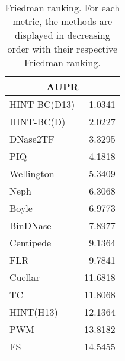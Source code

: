 \documentclass[landscape, 6pt]{report}
\begin{document}
\begin{table}[h!]
\label{tab:ranking}
\vspace{0.0cm}
\begin{center}
\caption{Friedman ranking. For each metric, the methods are displayed in decreasing order with their respective Friedman ranking.}
\renewcommand{\arraystretch}{1.2}
  \begin{tabular}{ |lr| }
    \hline
    \multicolumn{2}{|c|}{\textbf{AUPR}} \\
    \hline
    HINT-BC(D13) & 1.0341 \\
    HINT-BC(D) & 2.0227 \\
    DNase2TF & 3.3295 \\
    PIQ & 4.1818 \\
    Wellington & 5.3409 \\
    Neph & 6.3068 \\
    Boyle & 6.9773 \\
    BinDNase & 7.8977 \\
    Centipede & 9.1364 \\
    FLR & 9.7841 \\
    Cuellar & 11.6818 \\
    TC & 11.8068 \\
    HINT(H13) & 12.1364 \\
    PWM & 13.8182 \\
    FS & 14.5455 \\
    \hline
  \end{tabular}
\end{center}
\vspace{0.0cm}
\end{table}
\end{document}
